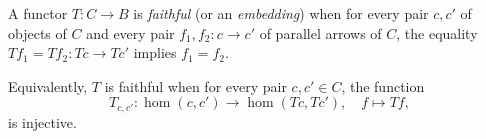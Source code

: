A functor $T: C \rightarrow B$ is \emph{faithful} (or an \emph{embedding}) when for every pair $c, c'$ of objects of $C$ and every pair $f_1, f_2: c \rightarrow c'$ of parallel arrows of $C$, the equality $Tf_1 = Tf_2: Tc \rightarrow Tc'$ implies $f_1 = f_2$.

Equivalently, $T$ is faithful when for every pair $c, c' \in C$, the function
$$T_{c, c'}: \hom(c, c') \rightarrow \hom(Tc, Tc'), \quad f \mapsto Tf,$$
is injective.
